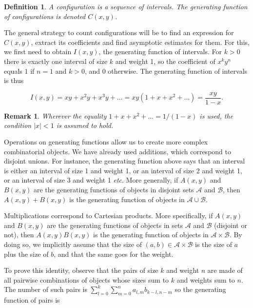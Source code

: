 \documentclass{article}
\newtheorem{definition}{Definition}
\newtheorem{remark}{Remark}
\begin{document}
\begin{definition}
A configuration is a sequence of intervals. The generating function of
configurations is denoted $C(x,y)$.
\end{definition}

The general strategy to count configurations will be to find an expression
for $C(x,y)$, extract its coefficients and find asymptotic estimates for
them. For this, we first need to obtain $I(x,y)$, the generating function
of intervals. For $k > 0$ there is exactly one interval of size $k$ and
weight 1, so the coefficient of $x^ky^n$ equals $1$ if $n = 1$ and $k >
0$, and $0$ otherwise. The generating function of intervals is thus

\begin{equation}
\label{eq:F}
I(x,y) = xy + x^2y + x^3y + \ldots
= xy(1+x+x^2+\ldots) = \frac{xy}{1-x}.
\end{equation}

\begin{remark}
Wherever the equality $1+x+x^2+\ldots = 1/(1-x)$ is used, the condition
$|x| < 1$ is assumed to hold.
\end{remark}

Operations on generating functions allow us to create more complex
combinatorial objects. We have already used additions, which correspond
to disjoint unions. For instance, the generating function above says that
an interval is either an interval of size 1 and weight 1, or an interval
of size 2 and weight 1, or an interval of size 3 and weight 1
\textit{etc}. More generally, if $A(x,y)$ and $B(x,y)$ are the generating
functions of objects in disjoint sets $\mathcal{A}$ and $\mathcal{B}$,
then $A(x,y)+B(x,y)$ is the generating function of objects in $\mathcal{A}
\cup \mathcal{B}$.

Multiplications correspond to Cartesian products. More specifically, if
$A(x,y)$ and $B(x,y)$ are the generating functions of objects in sets
$\mathcal{A}$ and $\mathcal{B}$ (disjoint or not), then $A(x,y)B(x,y)$ is
the generating function of objects in $\mathcal{A} \times \mathcal{B}$.
By doing so, we implicitly assume that the size of $(a,b) \in \mathcal{A}
\times \mathcal{B}$ is the size of $a$ plus the size of $b$, and that the
same goes for the weight.

To prove this identity, observe that the pairs of size $k$ and weight $n$
are made of all pairwise combinations of objects whose sizes sum to $k$
and weights sum to $n$. The number of such pairs is $\sum_{l=0}^k
\sum_{m=0}^n a_{l,m}b_{k-l,n-m}$ so the generating function of pairs is
\end{document}
